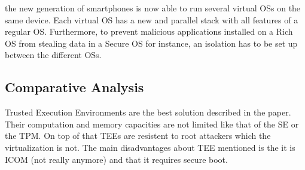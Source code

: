 \documentclass{article}
\begin{document}
the new generation of smartphones is now able to run several virtual OSs on the same device. Each virtual OS has a new and parallel stack with all features of a regular OS. Furthermore, to prevent malicious applications installed on a Rich OS from stealing data in a Secure OS for instance, an isolation has to be set up between the different OSs.

\subsection{Comparative Analysis}

Trusted Execution Environments are the best solution described in the paper. Their computation and memory capacities are not limited like that of the SE or the TPM. On top of that TEEs are resistent to root attackers which the virtualization is not. The main disadvantages about TEE mentioned is the it is ICOM (not really anymore) and that it requires secure boot.
\end{document}
